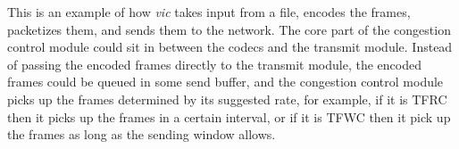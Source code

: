 This is an example of how \emph{vic} takes input from a file, encodes the
frames, packetizes them, and sends them to the network. The core part of the
congestion control module could sit in between the codecs and the transmit
module. Instead of passing the encoded frames directly to the transmit module,
the encoded frames could be queued in some send buffer, and the congestion
control module picks up the frames determined by its suggested rate, for
example, if it is TFRC then it picks up the frames in a certain interval, or if
it is TFWC then it pick up the frames as long as the sending window allows.

\newpage
